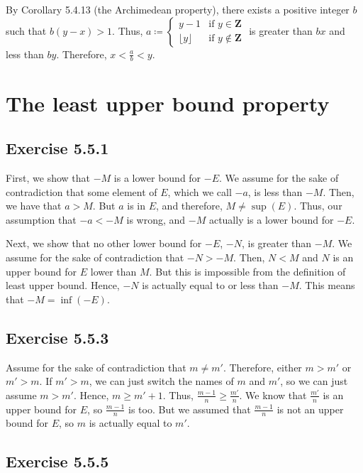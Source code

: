 \documentclass[12pt, oneside]{book}
\begin{document}
	By Corollary 5.4.13 (the Archimedean property), there exists a positive integer $b$ such that $b(y - x) > 1$. Thus, $a \coloneqq
	\begin{cases}
		y - 1 & \text{if } y \in \mathbf{Z} \\
		\lfloor y \rfloor & \text{if } y \not \in \mathbf{Z}
	\end{cases}$
	is greater than $bx$ and less than $by$. Therefore, $x < \frac{a}{b} < y$.
	
	\section{The least upper bound property}
	
	\subsection*{Exercise 5.5.1}
	
	First, we show that $-M$ is a lower bound for $-E$. We assume for the sake of contradiction that some element of $E$, which we call $-a$, is less than $-M$. Then, we have that $a > M$. But $a$ is in $E$, and therefore, $M \ne \sup(E)$. Thus, our assumption that $-a < -M$ is wrong, and $-M$ actually is a lower bound for $-E$.
	
	Next, we show that no other lower bound for $-E$, $-N$, is greater than $-M$. We assume for the sake of contradiction that $-N > -M$. Then, $N < M$ and $N$ is an upper bound for $E$ lower than $M$. But this is impossible from the definition of least upper bound. Hence, $-N$ is actually equal to or less than $-M$. This means that $-M = \inf(-E)$.
	
	\subsection*{Exercise 5.5.3}
	
	Assume for the sake of contradiction that $m \ne m'$. Therefore, either $m > m'$ or $m' > m$. If $m' > m$, we can just switch the names of $m$ and $m'$, so we can just assume $m > m'$. Hence, $m \ge m' + 1$. Thus, $\frac{m - 1}{n} \ge \frac{m'}{n}$. We know that $\frac{m'}{n}$ is an upper bound for $E$, so $\frac{m - 1}{n}$ is too. But we assumed that $\frac{m - 1}{n}$ is not an upper bound for $E$, so $m$ is actually equal to $m'$.
	
	\subsection*{Exercise 5.5.5}
	
\end{document}
